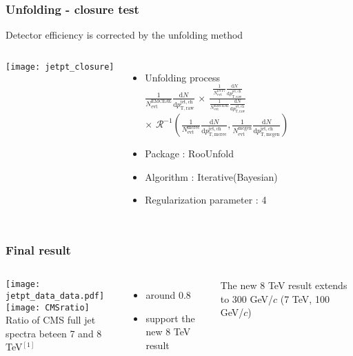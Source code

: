 \begin{frame}
\frametitle{Unfolding - closure test}
Detector efficiency is corrected by the unfolding method
\begin{columns}[c]
\centering
\texttt{[image: jetpt\_closure]}\\
\begin{itemize}
  \small
	\item{Unfolding process\\$\frac{1}{N_\mathrm{evt}^\mathrm{EMCEJE}} \frac{\mathrm{d}N}{\mathrm{d}p_\mathrm{T,raw}^\mathrm{jet,ch}}$
  $\times$ $\frac{\frac{1}{N_\mathrm{evt}^\mathrm{INT7}} \frac{\mathrm{d}N}{\mathrm{d}p_\mathrm{T,raw}^\mathrm{jet,ch}}}{\frac{1}{N_\mathrm{evt}^\mathrm{EMCEJE}} \frac{\mathrm{d}N}{\mathrm{d}p_\mathrm{T,raw}^\mathrm{jet,ch}}}$
  \\ $\times$ $\mathcal{R}^{-1}(\frac{1}{N_\mathrm{evt}^\mathrm{mcrec}} \frac{\mathrm{d}N}{\mathrm{d}p_\mathrm{T,mcrec}^\mathrm{jet,ch}},\frac{1}{N_\mathrm{evt}^\mathrm{mcgen}} \frac{\mathrm{d}N}{\mathrm{d}p_\mathrm{T,mcgen}^\mathrm{jet,ch}})$}
  \normalsize
  \item{Package : RooUnfold}
	\item{Algorithm : Iterative(Bayesian)}
	\item{Regularization parameter : 4}
\end{itemize}
\end{columns}
\end{frame}


\begin{frame}
\frametitle{Final result}
\begin{columns}[c]
\texttt{[image: jetpt\_data\_data.pdf]}
\texttt{[image: CMSratio]}\\
Ratio of CMS full jet spectra beteen 7 and 8 TeV$^{[1]}$
\begin{itemize}
  \item{around 0.8}
  \item{support the new 8 TeV result}
\end{itemize}
The new 8 TeV result extends to 300 GeV/$c$ (7 TeV, 100 GeV/$c$)
\end{columns}
\end{frame}

